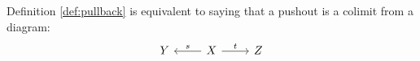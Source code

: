 \begin{definition}
  Definition \ref{def:pullback} is equivalent to saying that a pushout is a colimit
  from a diagram:
  \[\begin{tikzcd}[ampersand replacement=\&]
    Y \& X \& Z
    \arrow["t", from=1-2, to=1-3]
    \arrow["s"', from=1-2, to=1-1]
  \end{tikzcd}\]
\end{definition}